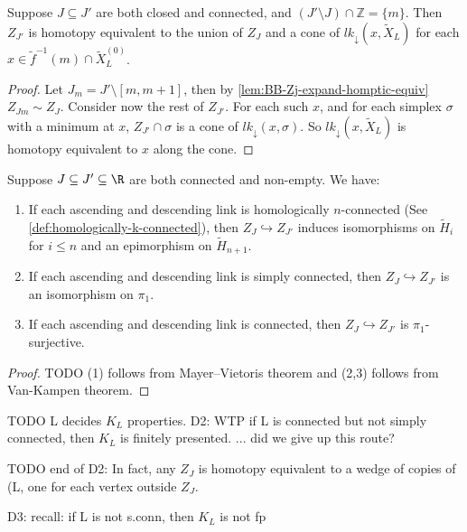 \begin{lemma}
    \label{lem:BB-Zj-expand-cross-vertex}
    Suppose \(J\subseteq J'\) are both closed and connected, and \((J'\setminus J)\cap  \mathbb{Z}  = \{m\}\). Then \(Z_{J'}\) is homotopy equivalent to the union of \(Z_J\) and a cone of \(lk_\downarrow(x,\tilde X_L)\) for each \(x\in \tilde f^{-1}(m) \cap \tilde X_L^{(0)}\).
\end{lemma}
\begin{proof}
    Let \(J_m = J'\setminus [m,m+1]\), then by \cref{lem:BB-Zj-expand-homptic-equiv} \(Z_{Jm}\sim Z_J\). 
    Consider now the rest of \(Z_{J'}\).
    For each such \(x\), and for each simplex \(\sigma\) with a minimum at \(x\), \(Z_{J'}\cap \sigma\) is a cone of \(lk_\downarrow(x,\sigma)\). So  \(lk_\downarrow(x,\tilde X_L)\) is homotopy equivalent to \(x\) along the cone.
\end{proof}

\begin{corollary}
    \label{cor:asc-desc-link-homology-property}
    Suppose \(J\subseteq J' \subseteq \R\) are both connected and non-empty. We have:
    \begin{enumerate}
        \item If each ascending and descending link is homologically \(n\)-connected (See \cref{def:homologically-k-connected}), then \(Z_J \hookrightarrow Z_{J'}\) induces isomorphisms on \(\tilde H_i\) for \(i\leq n\) and an epimorphism  on \(\tilde H_{n+1}\).
        \item If each ascending and descending link is simply connected, then \(Z_J \hookrightarrow Z_{J'}\) is an isomorphism on \(\pi_1\).
        \item If each ascending and descending link is connected, then \(Z_J \hookrightarrow Z_{J'}\) is \(\pi_1\)-surjective.
    \end{enumerate}
\end{corollary}
\begin{proof}
    TODO 
    (1) follows from Mayer–Vietoris theorem and (2,3) follows from Van-Kampen theorem.
\end{proof}

TODO L decides \(K_L\) properties. D2: WTP if L is connected but not simply connected, then \(K_L\) is finitely presented. ... did we give up this route?

TODO end of D2: In fact, any \(Z_J\) is homotopy equivalent to a wedge of copies of \LL(L\), one for each vertex outside \(Z_J\).

D3: recall: if L is not s.conn, then \(K_L\) is not fp